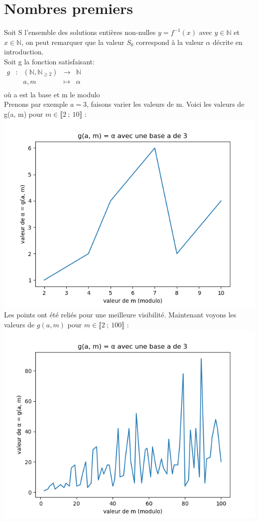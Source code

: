 \documentclass{article}
\begin{document}
\section{Nombres premiers}
Soit S l'ensemble des solutions entières non-nulles $y=f^{-1}(x)$ avec $y\in\mathbb{N}$ et $x\in\mathbb{N}$, on peut remarquer que la valeur $S_0$ correspond à la valeur $\alpha$ décrite en introduction.\\
Soit g la fonction satisfaisant:\\
$\begin{array}{ccccc}
g & : & (\mathbb{N}, \mathbb{N}_{\geq 2}) & \to & \mathbb{N} \\
 & & a,m & \mapsto & \alpha \\
\end{array}$\\ où a est la base et m le modulo\\
Prenons par exemple $a=3$, faisons varier les valeurs de m. Voici les valeurs de g(a, m) pour $m\in\llbracket 2~;~10 \rrbracket$ :\\
\includegraphics{images/Figure_1.png}\\
Les points ont été reliés pour une meilleure visibilité. Maintenant voyons les valeurs de $g(a,m)$ pour $m\in\llbracket 2~;~100 \rrbracket$ :\\
\includegraphics{images/Figure_2.png}\\
\end{document}
